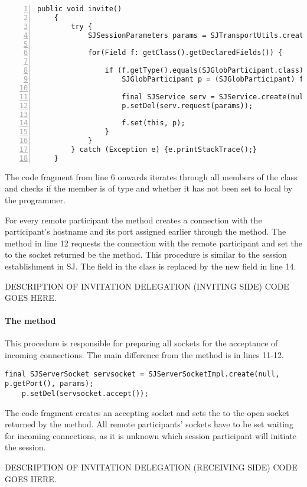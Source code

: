 \begin{lstlisting}[basicstyle=\LISTINGSTYLE, numbers=left, caption=SORT INVITATION DELEGATION OUT IN THIS ONE!!]
	public void invite() 
	{
		try {
			SJSessionParameters params = SJTransportUtils.createSJSessionParameters("d", "d");
		
			for(Field f: getClass().getDeclaredFields()) {
			
				if (f.getType().equals(SJGlobParticipant.class) && (!((SJGlobParticipant) f.get(this)).isLocal())) {
					SJGlobParticipant p = (SJGlobParticipant) f.get(this);;	
				
					final SJService serv = SJService.create(null, p.getHostname(), p.getPort());
					p.setDel(serv.request(params));
				
					f.set(this, p);
				}
			}
		} catch (Exception e) {e.printStackTrace();} 
	}
\end{lstlisting}

The code fragment from line 6 onwards iterates through all members of the class and checks if the member is of type  and whether it has not been set to local by the programmer. 

For every remote participant the  method creates a connection with the participant's hostname and its port assigned earlier through the  method. The method  in line 12 requests the connection with the remote participant and set the  to the socket returned be the  method. This procedure is similar to the session establishment in SJ. The field in the class is replaced by the new field in line 14.

DESCRIPTION OF INVITATION DELEGATION (INVITING SIDE) CODE GOES HERE.


\paragraph*{The  method} This procedure is responsible for preparing all sockets for the acceptance of incoming connections. The main difference from the  method is in lines 11-12.

\begin{lstlisting}[basicstyle=\LISTINGSTYLE]
	final SJServerSocket servsocket = SJServerSocketImpl.create(null, p.getPort(), params);
	p.setDel(servsocket.accept());
\end{lstlisting}

The code fragment creates an accepting socket and sets the  to the open socket returned by the  method. All remote participants' sockets have to be set waiting for incoming connections, as it is unknown which session participant will initiate the session.

DESCRIPTION OF INVITATION DELEGATION (RECEIVING SIDE) CODE GOES HERE.


